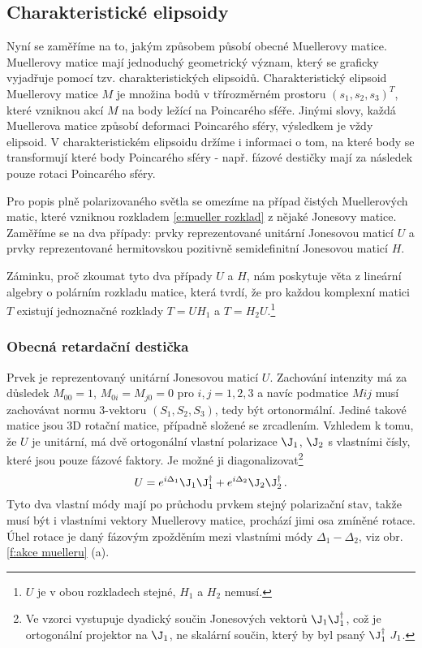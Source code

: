 \subsection{Charakteristické elipsoidy \cite{Muellergeom}}

Nyní se zaměříme na to, jakým způsobem působí obecné Muellerovy matice.
Muellerovy matice mají jednoduchý geometrický význam, který se graficky vyjadřuje pomocí tzv. charakteristických elipsoidů.
Charakteristický elipsoid Muellerovy matice $M$ je množina bodů v třírozměrném prostoru $(s_1, s_2, s_3)^T$, které vzniknou akcí $M$ na body ležící na Poincarého sféře.
Jinými slovy, každá Muellerova matice způsobí deformaci Poincarého sféry, výsledkem je vždy elipsoid.
V charakteristickém elipsoidu držíme i informaci o tom, na které body se transformují které body Poincarého sféry - např. fázové destičky mají za následek pouze rotaci Poincarého sféry.

Pro popis plně polarizovaného světla se omezíme na případ čistých Muellerových matic, které vzniknou rozkladem \eqref{e:mueller rozklad} z nějaké Jonesovy matice.
Zaměříme se na dva případy: prvky reprezentované unitární Jonesovou maticí $U$ a prvky reprezentované hermitovskou pozitivně semidefinitní Jonesovou maticí $H$.

Záminku, proč zkoumat tyto dva případy $U$ a $H$, nám poskytuje věta z lineární algebry o polárním rozkladu matice\cite{pestujemealgebru}, která tvrdí, že pro každou komplexní matici $T$ existují jednoznačné rozklady $T=U H_1$ a $T=H_2 U$.\footnote{$U$ je v obou rozkladech stejné, $H_1$ a $H_2$ nemusí.}

\subsubsection*{Obecná retardační destička}

Prvek je reprezentovaný unitární Jonesovou maticí $U$.
Zachování intenzity má za důsledek $M_{00}=1$, $M_{0i}=M_{j0}=0$ pro $i,j=1,2,3$ a navíc podmatice $M{ij}$ musí zachovávat normu 3-vektoru $(S_1, S_2, S_3)$, tedy být ortonormální.
Jediné takové matice jsou 3D rotační matice, případně složené se zrcadlením.
Vzhledem k tomu, že $U$ je unitární, má dvě ortogonální vlastní polarizace $\J_1$, $\J_2$ s vlastními čísly, které jsou pouze fázové faktory. Je možné ji diagonalizovat\footnote{Ve vzorci vystupuje dyadický součin Jonesových vektorů $\J_1\J_1^\dagger$, což je ortogonální projektor na $\J_1$, ne skalární součin, který by byl psaný $\J_1^\dagger\ J_1$.}
\begin{equation}
U=e^{i\Delta_1} \J_1 \J_1^\dagger + e^{i\Delta_2} \J_2 \J_2^\dagger\,.
\end{equation}
Tyto dva vlastní módy mají po průchodu prvkem stejný polarizační stav, takže musí být i vlastními vektory Muellerovy matice, prochází jimi osa zmíněné rotace.
Úhel rotace je daný fázovým zpožděním mezi vlastními módy $\Delta_1-\Delta_2$, viz obr. \ref{f:akce muelleru} (a).


